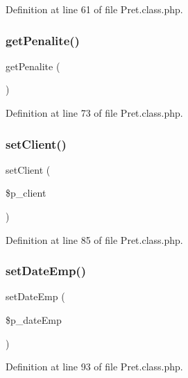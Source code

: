 Definition at line 61 of file Pret.\+class.\+php.

\mbox{\label{class_pret_a0eac81d4f3534a285e7abe04dc6a2b4c}} 
\subsubsection{\texorpdfstring{get\+Penalite()}{getPenalite()}}
{\footnotesize\ttfamily get\+Penalite (\begin{DoxyParamCaption}{ }\end{DoxyParamCaption})}



Definition at line 73 of file Pret.\+class.\+php.

\mbox{\label{class_pret_addc317db48b6f5bddc99581c2c6464eb}} 
\subsubsection{\texorpdfstring{set\+Client()}{setClient()}}
{\footnotesize\ttfamily set\+Client (\begin{DoxyParamCaption}\item[{}]{\$p\+\_\+client }\end{DoxyParamCaption})}



Definition at line 85 of file Pret.\+class.\+php.

\mbox{\label{class_pret_aa698d4791c453b088a1428cd5244b3bd}} 
\subsubsection{\texorpdfstring{set\+Date\+Emp()}{setDateEmp()}}
{\footnotesize\ttfamily set\+Date\+Emp (\begin{DoxyParamCaption}\item[{}]{\$p\+\_\+date\+Emp }\end{DoxyParamCaption})}



Definition at line 93 of file Pret.\+class.\+php.

\mbox{\label{class_pret_a9235ca829aedf23f31a1d408e9fc9d30}} 

